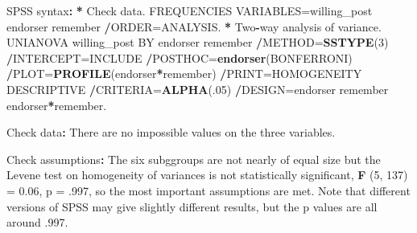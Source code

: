 \documentclass[a4paper]{book}
\newenvironment{Shaded}{\begin{snugshade}}{\end{snugshade}}
\newcommand{\KeywordTok}[1]{\textcolor[rgb]{0,0,0}{\textbf{#1}}}
\newcommand{\DecValTok}[1]{\textcolor[rgb]{0.00,0.00,0.00}{#1}}
\newcommand{\FloatTok}[1]{\textcolor[rgb]{0.00,0.00,0.00}{#1}}
\newcommand{\StringTok}[1]{\textcolor[rgb]{0.00,0.00,0.00}{#1}}
\newcommand{\OperatorTok}[1]{\textcolor[rgb]{0.00,0.00,0.00}{\textbf{#1}}}
\newcommand{\ErrorTok}[1]{\textcolor[rgb]{0.00,0.00,0.00}{\textbf{#1}}}
\newcommand{\NormalTok}[1]{#1}
\theoremstyle{definition}
\theoremstyle{definition}
\theoremstyle{definition}
\theoremstyle{remark}
\begin{document}
\begin{Shaded}
\begin{Highlighting}[]
\NormalTok{SPSS syntax}\OperatorTok{:}\StringTok{  }
\StringTok{  }
\ErrorTok{*}\StringTok{ }\NormalTok{Check data.  }
\NormalTok{FREQUENCIES VARIABLES=willing_post endorser remember  }
  \OperatorTok{/}\NormalTok{ORDER=ANALYSIS.  }
\OperatorTok{*}\StringTok{ }\NormalTok{Two}\OperatorTok{-}\NormalTok{way analysis of variance.  }
\NormalTok{UNIANOVA willing_post BY endorser remember  }
  \OperatorTok{/}\NormalTok{METHOD=}\KeywordTok{SSTYPE}\NormalTok{(}\DecValTok{3}\NormalTok{)  }
  \OperatorTok{/}\NormalTok{INTERCEPT=INCLUDE  }
  \OperatorTok{/}\NormalTok{POSTHOC=}\KeywordTok{endorser}\NormalTok{(BONFERRONI)   }
  \OperatorTok{/}\NormalTok{PLOT=}\KeywordTok{PROFILE}\NormalTok{(endorser}\OperatorTok{*}\NormalTok{remember)  }
  \OperatorTok{/}\NormalTok{PRINT=HOMOGENEITY DESCRIPTIVE  }
  \OperatorTok{/}\NormalTok{CRITERIA=}\KeywordTok{ALPHA}\NormalTok{(.}\DecValTok{05}\NormalTok{)  }
  \OperatorTok{/}\NormalTok{DESIGN=endorser remember endorser}\OperatorTok{*}\NormalTok{remember.  }
  
\NormalTok{Check data}\OperatorTok{:}\StringTok{  }
\StringTok{  }
\NormalTok{There are no impossible values on the three variables.  }
  
\NormalTok{Check assumptions}\OperatorTok{:}\StringTok{  }
\StringTok{  }
\NormalTok{The six subggroups are not nearly of equal size but the Levene test on  }
\NormalTok{homogeneity of variances is not statistically significant, }\KeywordTok{F}\NormalTok{ (}\DecValTok{5}\NormalTok{, }\DecValTok{137}\NormalTok{) =}\StringTok{ }\FloatTok{0.06}\NormalTok{,  }
\NormalTok{p =}\StringTok{ }\NormalTok{.}\DecValTok{997}\NormalTok{, so the most important assumptions are met. Note that different}
\NormalTok{versions of SPSS may give slightly different results, but the p values are all}
\NormalTok{around .}\DecValTok{997}\NormalTok{. }
  

\end{Highlighting}
\end{Shaded}
\end{document}
